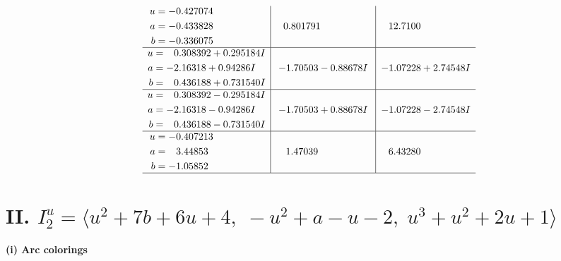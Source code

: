 \documentclass[1p]{elsarticle_modified}
\theoremstyle{definition}
\begin{document}
$$\begin{array}{c|c|c}
\begin{aligned}
u &= -0.427074\phantom{ +0.000000I} \\
a &= -0.433828\phantom{ +0.000000I} \\
b &= -0.336075\phantom{ +0.000000I}\end{aligned}
 & \phantom{-}0.801791\phantom{ +0.000000I} & \phantom{-}12.7100\phantom{ +0.000000I} \\ \hline\begin{aligned}
u &= \phantom{-}0.308392 + 0.295184 I \\
a &= -2.16318 + 0.94286 I \\
b &= \phantom{-}0.436188 + 0.731540 I\end{aligned}
 & -1.70503 - 0.88678 I & -1.07228 + 2.74548 I \\ \hline\begin{aligned}
u &= \phantom{-}0.308392 - 0.295184 I \\
a &= -2.16318 - 0.94286 I \\
b &= \phantom{-}0.436188 - 0.731540 I\end{aligned}
 & -1.70503 + 0.88678 I & -1.07228 - 2.74548 I \\ \hline\begin{aligned}
u &= -0.407213\phantom{ +0.000000I} \\
a &= \phantom{-}3.44853\phantom{ +0.000000I} \\
b &= -1.05852\phantom{ +0.000000I}\end{aligned}
 & \phantom{-}1.47039\phantom{ +0.000000I} & \phantom{-}6.43280\phantom{ +0.000000I}\\
 \hline 
 \end{array}$$\newpage\newpage\renewcommand{\arraystretch}{1}
\centering \section*{II. $I^u_{2}= \langle u^2+7 b+6 u+4,\;- u^2+a- u-2,\;u^3+u^2+2 u+1 \rangle$}
\flushleft \textbf{(i) Arc colorings}\\
\end{document}
